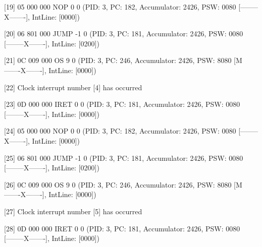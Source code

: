 [\textcolor{termred}{19}] {05 000 000} NOP 0 0 (PID: \textcolor{termgreen}{3}, PC: \textcolor{termred}{182}, Accumulator: \textcolor{termred}{2426}, PSW: \textcolor{termred}{0080} [\textcolor{termred}{--------X-------}], IntLine: [\textcolor{termred}{0000}])

[\textcolor{termred}{20}] {06 801 000} JUMP -1 0 (PID: \textcolor{termgreen}{3}, PC: \textcolor{termred}{181}, Accumulator: \textcolor{termred}{2426}, PSW: \textcolor{termred}{0080} [\textcolor{termred}{--------X-------}], IntLine: [\textcolor{termred}{0200}])

[\textcolor{termred}{21}] {0C 009 000} OS 9 0 (PID: \textcolor{termgreen}{3}, PC: \textcolor{termred}{246}, Accumulator: \textcolor{termred}{2426}, PSW: \textcolor{termred}{8080} [\textcolor{termred}{M-------X-------}], IntLine: [\textcolor{termred}{0000}])

	[\textcolor{termred}{22}] \textcolor{termcyan}{Clock interrupt number [4] has occurred}

[\textcolor{termred}{23}] {0D 000 000} IRET 0 0 (PID: \textcolor{termgreen}{3}, PC: \textcolor{termred}{181}, Accumulator: \textcolor{termred}{2426}, PSW: \textcolor{termred}{0080} [\textcolor{termred}{--------X-------}], IntLine: [\textcolor{termred}{0000}])

[\textcolor{termred}{24}] {05 000 000} NOP 0 0 (PID: \textcolor{termgreen}{3}, PC: \textcolor{termred}{182}, Accumulator: \textcolor{termred}{2426}, PSW: \textcolor{termred}{0080} [\textcolor{termred}{--------X-------}], IntLine: [\textcolor{termred}{0000}])

[\textcolor{termred}{25}] {06 801 000} JUMP -1 0 (PID: \textcolor{termgreen}{3}, PC: \textcolor{termred}{181}, Accumulator: \textcolor{termred}{2426}, PSW: \textcolor{termred}{0080} [\textcolor{termred}{--------X-------}], IntLine: [\textcolor{termred}{0200}])

[\textcolor{termred}{26}] {0C 009 000} OS 9 0 (PID: \textcolor{termgreen}{3}, PC: \textcolor{termred}{246}, Accumulator: \textcolor{termred}{2426}, PSW: \textcolor{termred}{8080} [\textcolor{termred}{M-------X-------}], IntLine: [\textcolor{termred}{0000}])

	[\textcolor{termred}{27}] \textcolor{termcyan}{Clock interrupt number [5] has occurred}

[\textcolor{termred}{28}] {0D 000 000} IRET 0 0 (PID: \textcolor{termgreen}{3}, PC: \textcolor{termred}{181}, Accumulator: \textcolor{termred}{2426}, PSW: \textcolor{termred}{0080} [\textcolor{termred}{--------X-------}], IntLine: [\textcolor{termred}{0000}])

